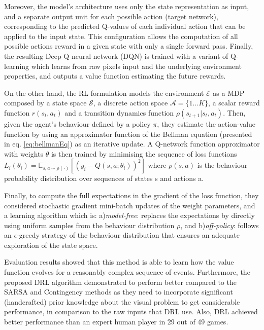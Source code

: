 Moreover, the model's architecture uses only the state representation as input, and a separate output unit for each possible action (target network), corresponding to the predicted Q-values of each individual action that can be applied to the input state. This configuration allows the computation of all possible actions reward in a given state with only a single forward pass. Finally, the resulting Deep Q neural network (DQN) is trained with a variant of Q-learning which learns from raw pixels input and the underlying environment properties, and outputs a value function estimating the future rewards.

On the other hand, the RL formulation models the environment $\mathcal{E}$ as a MDP composed by a state space $\mathcal{S}$, a discrete action space $\mathcal{A}=\{1...K\}$, a scalar reward function $r(s_t, a_t)$ and a transition dynamics function $\rho(s_{t+1}|s_t, a_t)$. Then, given the agent's behaviour defined by a policy $\pi$, they estimate the action-value function by using an approximator function of the Bellman equation (presented in eq. \ref{eq:bellmanEq}) as an iterative update. A Q-network function approximator with weights $\theta$ is then trained by minimising the sequence of loss functions $L_i(\theta_i) = \mathbb{E}_{s, a \sim \rho (\cdot)}[(y_i - Q(s, a; \theta_i))^2]$ where $\rho(s, a)$ is the behaviour probability distribution over sequences of states s and actions a.

Finally, to compute the full expectations in the gradient of the loss function, they considered stochastic gradient mini-batch updates of the weight parameters, and a learning algorithm which is: a)\textit{model-free}: replaces the expectations by directly using uniform samples from the behaviour distribution $\rho$, and b)\textit{off-policy}: follows an $\epsilon$-greedy strategy of the behaviour distribution that ensures an adequate exploration of the state space.

Evaluation results showed that this method is able to learn how the value function evolves for a reasonably complex sequence of events. Furthermore, the proposed DRL algorithm demonstrated to perform better compared to the SARSA and Contingency \cite{bellemare2012investigating} methods as they need to incorporate significant (handcrafted) prior knowledge about the visual problem to get considerable performance, in comparison to the raw inputs that DRL use. Also, DRL achieved better performance than an expert human player in 29 out of 49 games.

